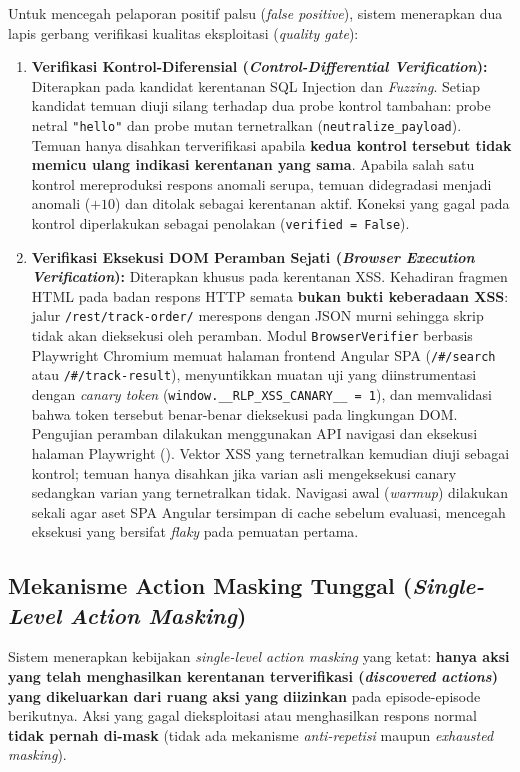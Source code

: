 Untuk mencegah pelaporan positif palsu (\textit{false positive}), sistem menerapkan dua lapis gerbang verifikasi kualitas eksploitasi (\textit{quality gate}):
\begin{enumerate}
    \item \textbf{Verifikasi Kontrol-Diferensial (\textit{Control-Differential Verification}):} Diterapkan pada kandidat kerentanan SQL Injection dan \textit{Fuzzing}. Setiap kandidat temuan diuji silang terhadap dua probe kontrol tambahan: probe netral \texttt{"hello"} dan probe mutan ternetralkan (\texttt{neutralize\_payload}). Temuan hanya disahkan terverifikasi apabila \textbf{kedua kontrol tersebut tidak memicu ulang indikasi kerentanan yang sama}. Apabila salah satu kontrol mereproduksi respons anomali serupa, temuan didegradasi menjadi anomali ($+10$) dan ditolak sebagai kerentanan aktif. Koneksi yang gagal pada kontrol diperlakukan sebagai penolakan (\texttt{verified = False}).
    \item \textbf{Verifikasi Eksekusi DOM Peramban Sejati (\textit{Browser Execution Verification}):} Diterapkan khusus pada kerentanan XSS. Kehadiran fragmen HTML pada badan respons HTTP semata \textbf{bukan bukti keberadaan XSS}: jalur \texttt{/rest/track-order/} merespons dengan JSON murni sehingga skrip tidak akan dieksekusi oleh peramban. Modul \texttt{BrowserVerifier} berbasis Playwright Chromium memuat halaman frontend Angular SPA (\texttt{/\#/search} atau \texttt{/\#/track-result}), menyuntikkan muatan uji yang diinstrumentasi dengan \textit{canary token} (\texttt{window.\_\_RLP\_XSS\_CANARY\_\_ = 1}), dan memvalidasi bahwa token tersebut benar-benar dieksekusi pada lingkungan DOM. Pengujian peramban dilakukan menggunakan API navigasi dan eksekusi halaman Playwright (\cite{playwrightPageApi}). Vektor XSS yang ternetralkan kemudian diuji sebagai kontrol; temuan hanya disahkan jika varian asli mengeksekusi canary sedangkan varian yang ternetralkan tidak. Navigasi awal (\textit{warmup}) dilakukan sekali agar aset SPA Angular tersimpan di cache sebelum evaluasi, mencegah eksekusi yang bersifat \textit{flaky} pada pemuatan pertama.
\end{enumerate}

\subsection{Mekanisme Action Masking Tunggal (\textit{Single-Level Action Masking})}

Sistem menerapkan kebijakan \textit{single-level action masking} yang ketat: \textbf{hanya aksi yang telah menghasilkan kerentanan terverifikasi (\textit{discovered actions}) yang dikeluarkan dari ruang aksi yang diizinkan} pada episode-episode berikutnya. Aksi yang gagal dieksploitasi atau menghasilkan respons normal \textbf{tidak pernah di-mask} (tidak ada mekanisme \textit{anti-repetisi} maupun \textit{exhausted masking}).

